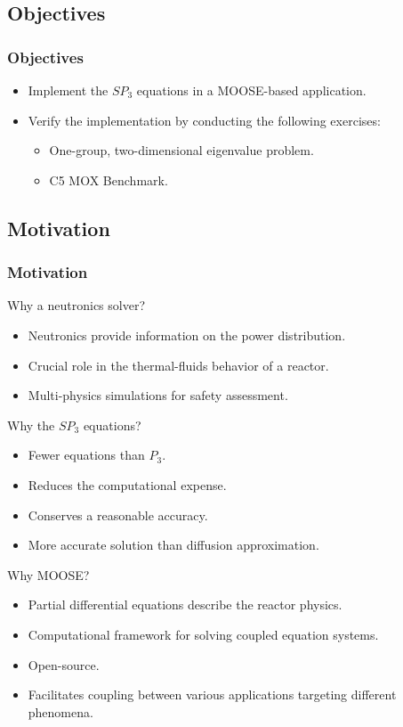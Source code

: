 \subsection{Objectives}

\begin{frame}
\frametitle{Objectives}
  \begin{itemize}
    \item Implement the $SP_3$ equations in a MOOSE-based application.
    \item Verify the implementation by conducting the following exercises:
      \begin{itemize}
        \item One-group, two-dimensional eigenvalue problem.
        \item C5 MOX Benchmark.
  	  \end{itemize}
  \end{itemize}
\end{frame}


\subsection{Motivation}

\begin{frame}
\frametitle{Motivation}
  
  Why a neutronics solver?
  \begin{itemize}
    \item Neutronics provide information on the power distribution.
    \item Crucial role in the thermal-fluids behavior of a reactor.
    \item Multi-physics simulations for safety assessment.
  \end{itemize}

  Why the $SP_3$ equations?
  \begin{itemize}
    \item Fewer equations than $P_3$.
    \item Reduces the computational expense.
    \item Conserves a reasonable accuracy.
    \item More accurate solution than diffusion approximation.
  \end{itemize}
  
  Why MOOSE?
  \begin{itemize}
    \item Partial differential equations describe the reactor physics.
    \item Computational framework for solving coupled equation systems.
    \item Open-source.
    \item Facilitates coupling between various applications targeting different phenomena.
  \end{itemize}

\end{frame}
